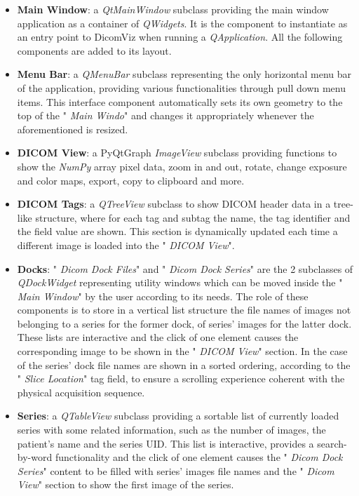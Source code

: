 \documentclass[conference]{IEEEtran}
\begin{document}
\begin{itemize}
    \item \textbf{Main Window}: a  \textit{QtMainWindow} subclass providing the main window application as a container of  \textit{QWidgets}. It is the component to instantiate as an entry point to DicomViz when running a  \textit{QApplication}. All the following components are added to its layout.

    \item \textbf{Menu Bar}: a  \textit{QMenuBar} subclass representing the only horizontal menu bar of the application, providing various functionalities through pull down menu items. This interface component  automatically sets its own geometry to the top of the " \textit{Main Windo}" and changes it appropriately whenever the aforementioned is resized.

    \item \textbf{DICOM View}: a PyQtGraph  \textit{ImageView} subclass providing functions to show the  \textit{NumPy} array pixel data, zoom in and out, rotate, change exposure and color maps, export, copy to clipboard and more.

    \item \textbf{DICOM Tags}: a  \textit{QTreeView} subclass to show DICOM header data in a tree-like structure, where for each tag and subtag the name, the tag identifier and the field value are shown. This section is dynamically updated each time a different image is loaded into the " \textit{DICOM View}".

    \item \textbf{Docks}: " \textit{Dicom Dock Files}" and " \textit{Dicom Dock Series}" are the 2 subclasses of  \textit{QDockWidget} representing utility windows which can be moved inside the " \textit{Main Window}" by the user according to its needs. The role of these components is to store in a vertical list structure the file names of images not belonging to a series for the former dock, of series' images for the latter dock. These lists are interactive and the click of one element causes the corresponding image to be shown in the " \textit{DICOM View}" section. In the case of the series' dock file names are shown in a sorted ordering, according to the " \textit{Slice Location}" tag field, to ensure a scrolling experience coherent with the physical acquisition sequence.

    \item \textbf{Series}: a  \textit{QTableView} subclass providing a sortable list of currently loaded series with some related information, such as the number of images, the patient's name and the series UID. This list is interactive, provides a search-by-word functionality and the click of one element causes the " \textit{Dicom Dock Series}" content to be filled with series' images file names and the " \textit{Dicom View}" section to show the first image of the series.

\end{itemize}
\end{document}
